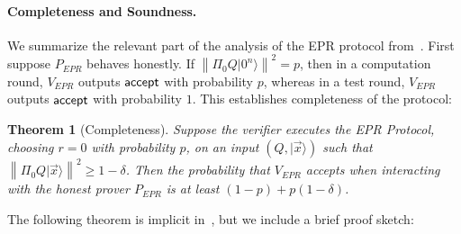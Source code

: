 \documentclass[11pt,letter]{article}
\newtheorem{theorem}{Theorem}
\theoremstyle{remark}
\theoremstyle{definition}
\newcommand{\ket}[1]{|#1\rangle}
\newcommand{\snote}[1]{\textcolor{green}{\small {\textbf{(Stacey:} #1 \textbf{) }}}}
\newcommand{\norm}[1]{\left\|#1\right\|}
\begin{document}


\paragraph{Completeness and Soundness.} 
We summarize the relevant part of the analysis of the EPR protocol from~\cite{broadbent15howtoverify}. First suppose $P_{EPR}$ behaves honestly. If $\norm{\Pi_0 Q\ket{0^n}}^2=p$, then in a computation round, $V_{EPR}$ outputs $\sf accept$ with probability $p$, whereas in a test round, $V_{EPR}$ outputs $\sf accept$ with probability $1$. This establishes completeness of the protocol:

\begin{theorem}[Completeness]\label{thm:EPR-correctness} 
Suppose the verifier executes the EPR Protocol, choosing $r=0$ with probability $p$, on an input $(Q,\ket{\vec{x}})$ such that $\norm{\Pi_0 Q\ket{\vec{x}}}^2\geq 1-\delta$. Then the probability that $V_{EPR}$ accepts when interacting with the honest prover $P_{EPR}$ is at least $(1-p)+p(1-\delta)$. 
\end{theorem}

The following theorem is implicit in~\cite[Section 7.6]{broadbent15howtoverify}, but we include a brief proof sketch:
\end{document}
